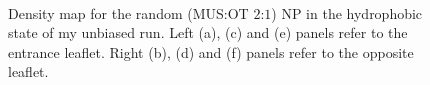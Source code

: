 \begin{figure}[p]
{		}\\%
	\caption{Density map for the random (\acs{MUS}:\acs{OT} $2$:$1$) \acs{NP} in the hydrophobic state of my unbiased run. Left (a), (c) and (e) panels refer to the entrance leaflet. Right (b), (d) and (f) panels refer to the opposite leaflet.}%
	\label{fig:random21Density}
\end{figure}

